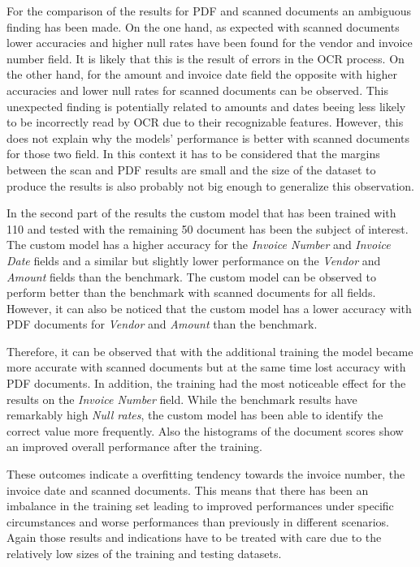 For the comparison of the results for PDF and scanned documents an ambiguous finding has been made. 
On the one hand, as expected with scanned documents lower accuracies and higher null rates have been found for the vendor and invoice number field. It is likely that this is the result of errors in the \ac{OCR} process.
On the other hand, for the amount and invoice date field the opposite with higher accuracies and lower null rates for scanned documents can be observed.
This unexpected finding is potentially related to amounts and dates beeing less likely to be incorrectly read by \ac{OCR} due to their recognizable features.
However, this does not explain why the models' performance is better with scanned documents for those two field. 
In this context it has to be considered that the margins between the scan and PDF results are small and the size of the dataset to produce the results is also probably not big enough to generalize this observation.

In the second part of the results the custom model that has been trained with 110 and tested with the remaining 50 document has been the subject of interest.
The custom model has a higher accuracy for the \textit{Invoice Number} and \textit{Invoice Date} fields and a similar but slightly lower performance on the \textit{Vendor} and \textit{Amount} fields than the benchmark.
The custom model can be observed to perform better than the benchmark with scanned documents for all fields. However, it can also be noticed that the custom model has a lower accuracy with PDF documents for \textit{Vendor} and \textit{Amount} than the benchmark.

Therefore, it can be observed that with the additional training the model became more accurate with scanned documents but at the same time lost accuracy with PDF documents. 
In addition, the training had the most noticeable effect for the results on the \textit{Invoice Number} field. 
While the benchmark results have remarkably high \textit{Null rates}, the custom model has been able to identify the correct value more frequently.
Also the histograms of the document scores show an improved overall performance after the training.

These outcomes indicate a overfitting tendency towards the invoice number, the invoice date and scanned documents.
This means that there has been an imbalance in the training set leading to improved performances under specific circumstances and worse performances than previously in different scenarios.
Again those results and indications have to be treated with care due to the relatively low sizes of the training and testing datasets.